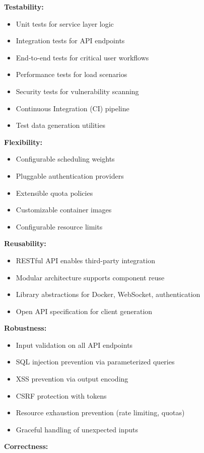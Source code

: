 \documentclass[12pt,a4paper]{article}
\begin{document}
\textbf{Testability:}

\begin{itemize}
    \item Unit tests for service layer logic
    \item Integration tests for API endpoints
    \item End-to-end tests for critical user workflows
    \item Performance tests for load scenarios
    \item Security tests for vulnerability scanning
    \item Continuous Integration (CI) pipeline
    \item Test data generation utilities
\end{itemize}

\textbf{Flexibility:}

\begin{itemize}
    \item Configurable scheduling weights
    \item Pluggable authentication providers
    \item Extensible quota policies
    \item Customizable container images
    \item Configurable resource limits
\end{itemize}

\textbf{Reusability:}

\begin{itemize}
    \item RESTful API enables third-party integration
    \item Modular architecture supports component reuse
    \item Library abstractions for Docker, WebSocket, authentication
    \item Open API specification for client generation
\end{itemize}

\textbf{Robustness:}

\begin{itemize}
    \item Input validation on all API endpoints
    \item SQL injection prevention via parameterized queries
    \item XSS prevention via output encoding
    \item CSRF protection with tokens
    \item Resource exhaustion prevention (rate limiting, quotas)
    \item Graceful handling of unexpected inputs
\end{itemize}
\textbf{Correctness:}
\end{document}
